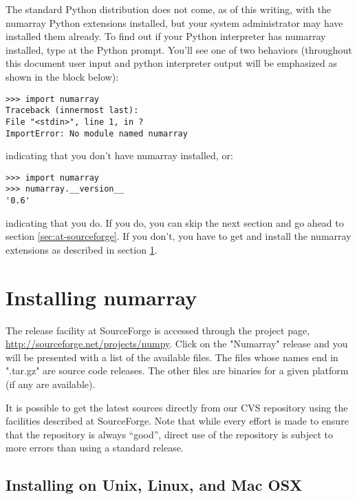 The standard Python distribution does not come, as of this writing, with the
numarray Python extensions installed, but your system administrator may have
installed them already. To find out if your Python interpreter has numarray
installed, type  at the Python prompt. You'll see one of
two behaviors (throughout this document user input and python interpreter
output will be emphasized as shown in the block below):
\begin{verbatim}
>>> import numarray
Traceback (innermost last):
File "<stdin>", line 1, in ?
ImportError: No module named numarray
\end{verbatim}
indicating that you don't have numarray installed, or:
\begin{verbatim}
>>> import numarray
>>> numarray.__version__
'0.6'
\end{verbatim}
indicating that you do. If you do, you can skip the next section
and go ahead to section \ref{sec:at-sourceforge}.  If you don't, you have to
get and install the numarray extensions as described in section
\ref{sec:installing-numarray}.

\section{Installing numarray}
\label{sec:installing-numarray}

The release facility at SourceForge is accessed through the project page,
\url{http://sourceforge.net/projects/numpy}.  Click on the "Numarray" release
and you will be presented with a list of the available files. The files whose
names end in ".tar.gz" are source code releases. The other files are binaries
for a given platform (if any are available).

It is possible to get the latest sources directly from our CVS repository using
the facilities described at SourceForge. Note that while every effort is made
to ensure that the repository is always ``good'', direct use of the repository
is subject to more errors than using a standard release.


\subsection{Installing on Unix, Linux, and Mac OSX}
\label{sec:installing-unix}

